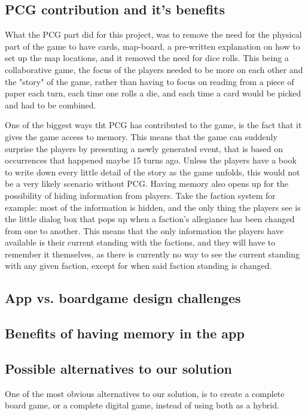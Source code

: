 \subsection{PCG contribution and it's benefits}
What the PCG part did for this project, was to remove the need for the physical part of the game to have cards, map-board, a pre-written explanation on how to set up the map locations, and it removed the need for dice rolls. This being a collaborative game, the focus of the players needed to be more on each other and the "story" of the game, rather than having to focus on reading from a piece of paper each turn, each time one rolls a die, and each time a card would be picked and had to be combined.

One of the biggest ways tht PCG has contributed to the game, is the fact that it gives the game access to memory. This means that the game can suddenly surprise the players by presenting a newly generated event, that is based on occurrences that happened maybe 15 turns ago. Unless the players have a book to write down every little detail of the story as the game unfolds, this would not be a very likely scenario without PCG. 
Having memory also opens up for the possibility of hiding information from players. Take the faction system for example: most of the information is hidden, and the only thing the players see is the little dialog box that pops up when a faction's allegiance has been changed from one to another. This means that the only information the players have available is their current standing with the factions, and they will have to remember it themselves, as there is currently no way to see the current standing with any given faction, except for when said faction standing is changed. 


\subsection{App vs. boardgame design challenges}
\subsection{Benefits of having memory in the app}
\subsection{Possible alternatives to our solution}
One of the most obvious alternatives to our solution, is to create a complete board game, or a complete digital game, instead of using both as a hybrid. 






